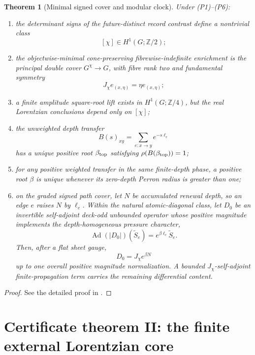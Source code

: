\documentclass[11pt]{article}
\newtheorem{theorem}{Theorem}[section]
\theoremstyle{definition}
\theoremstyle{remark}
\newcommand{\Ad}{\operatorname{Ad}}
\newcommand{\Ztwo}{\mathbb Z/2}
\newcommand{\Zfour}{\mathbb Z/4}
\begin{document}
\begin{theorem}[Minimal signed cover and modular clock]
\label{thm:signed-clock}
Under \textup{(P1)--(P6)}:
\begin{enumerate}[label=\textup{(\roman*)},leftmargin=2.7em]
\item the determinant signs of the future-distinct record contrast define a
      nontrivial class
      \[
        [\chi]\in H^1(G;\Ztwo);
      \]
\item the objectwise-minimal cone-preserving fibrewise-indefinite enrichment is
      the principal double cover $G^\chi\to G$, with fibre rank two and
      fundamental symmetry
      \[
        J_\chi e_{(x,\eta)}=\eta e_{(x,\eta)};
      \]
\item a finite amplitude square-root lift exists in $H^1(G;\Zfour)$, but the
      real Lorentzian conclusions depend only on $[\chi]$;
\item the unweighted depth transfer
      \[
        B(s)_{xy}=\sum_{e:x\to y}e^{-s\ell_e}
      \]
      has a unique positive root $\beta_{\rm top}$ satisfying
      $\rho(B(\beta_{\rm top}))=1$;
\item for any positive weighted transfer in the same finite-depth phase, a
      positive root $\beta$ is unique whenever its zero-depth Perron radius is
      greater than one;
\item on the graded signed path cover, let $N$ be accumulated renewal
      depth, so an edge $e$ raises $N$ by $\ell_e$.  Within the natural
      atomic-diagonal class, let $D_0$ be an invertible self-adjoint deck-odd
      unbounded operator whose positive magnitude implements the
      depth-homogeneous pressure character,
      \[
        \Ad(|D_0|)(\widetilde S_e)
        =e^{\beta\ell_e}\widetilde S_e.
      \]
      Then, after a flat sheet gauge,
      \[
        D_0=J_\chi e^{\beta N}
      \]
      up to one overall positive magnitude normalization.  A bounded
      $J_\chi$-self-adjoint finite-propagation term carries the remaining
      differential content.
\end{enumerate}
\end{theorem}

\begin{proof}
See the detailed proof in .
\end{proof}

\section{Certificate theorem II: the finite external Lorentzian core}
\end{document}
